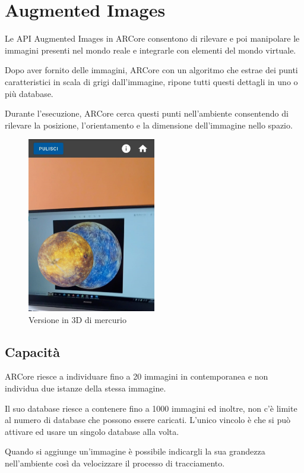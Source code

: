 \documentclass[crop=false, class=book]{standalone}
\begin{document}
	\chapter{Augmented Images}
	
	
	Le API Augmented Images in ARCore consentono di rilevare e poi manipolare le immagini presenti nel mondo reale e integrarle con elementi del mondo virtuale.
	
	Dopo aver fornito delle immagini, ARCore con un algoritmo che estrae dei punti caratteristici in scala di grigi dall’immagine, ripone tutti questi dettagli in uno o più database.
	
	Durante l’esecuzione, ARCore cerca questi punti nell’ambiente consentendo di rilevare la posizione, l’orientamento e la dimensione dell’immagine nello spazio.
\begin{figure}[htp]
\centering
\includegraphics[width=0.5\textwidth]{./resources/images/AugmentedImages/Img1.jpeg}
\caption{Versione in 3D di mercurio} 
\end{figure}

	\section{Capacità}
	ARCore riesce a individuare fino a 20 immagini in contemporanea e non individua due istanze della stessa immagine.
	
	Il suo database riesce a contenere fino a 1000 immagini ed inoltre, non c’è limite al numero di database che possono essere caricati. L’unico vincolo è che si può attivare ed usare un singolo database alla volta.
	
	Quando si aggiunge un’immagine è possibile indicargli la sua grandezza nell’ambiente così da velocizzare il processo di tracciamento.
	
\end{document}
